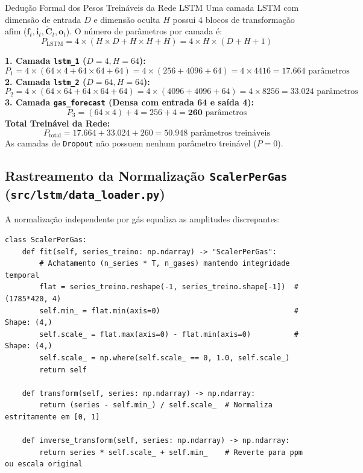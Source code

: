 \documentclass[11pt,a4paper]{article}
\begin{document}
\begin{mathBox}{Dedução Formal dos Pesos Treináveis da Rede LSTM}
Uma camada LSTM com dimensão de entrada $D$ e dimensão oculta $H$ possui 4 blocos de transformação afim ($\mathbf{f}_t, \mathbf{i}_t, \tilde{\mathbf{C}}_t, \mathbf{o}_t$). O número de parâmetros por camada é:
\begin{equation}
  P_{\text{LSTM}} = 4 \times \left( H \times D + H \times H + H \right) = 4 \times H \times (D + H + 1)
\end{equation}

\textbf{1. Camada \texttt{lstm\_1} ($D=4, H=64$):}
\begin{equation}
  P_1 = 4 \times \left( 64 \times 4 + 64 \times 64 + 64 \right) = 4 \times (256 + 4096 + 64) = 4 \times 4416 = \mathbf{17.664} \text{ parâmetros}
\end{equation}
\textbf{2. Camada \texttt{lstm\_2} ($D=64, H=64$):}
\begin{equation}
  P_2 = 4 \times \left( 64 \times 64 + 64 \times 64 + 64 \right) = 4 \times (4096 + 4096 + 64) = 4 \times 8256 = \mathbf{33.024} \text{ parâmetros}
\end{equation}
\textbf{3. Camada \texttt{gas\_forecast} (Densa com entrada 64 e saída 4):}
\begin{equation}
  P_3 = (64 \times 4) + 4 = 256 + 4 = \mathbf{260} \text{ parâmetros}
\end{equation}
\textbf{Total Treinável da Rede:}
\begin{equation}
  P_{\text{total}} = 17.664 + 33.024 + 260 = \mathbf{50.948} \text{ parâmetros treináveis}
\end{equation}
As camadas de \texttt{Dropout} não possuem nenhum parâmetro treinável ($P=0$).
\end{mathBox}

\subsection{Rastreamento da Normalização \texttt{ScalerPerGas} (\texttt{src/lstm/data\_loader.py})}
A normalização independente por gás equaliza as amplitudes discrepantes:

\begin{lstlisting}
class ScalerPerGas:
    def fit(self, series_treino: np.ndarray) -> "ScalerPerGas":
        # Achatamento (n_series * T, n_gases) mantendo integridade temporal
        flat = series_treino.reshape(-1, series_treino.shape[-1])  # (1785*420, 4)
        self.min_ = flat.min(axis=0)                               # Shape: (4,)
        self.scale_ = flat.max(axis=0) - flat.min(axis=0)          # Shape: (4,)
        self.scale_ = np.where(self.scale_ == 0, 1.0, self.scale_)
        return self

    def transform(self, series: np.ndarray) -> np.ndarray:
        return (series - self.min_) / self.scale_  # Normaliza estritamente em [0, 1]

    def inverse_transform(self, series: np.ndarray) -> np.ndarray:
        return series * self.scale_ + self.min_    # Reverte para ppm ou escala original
\end{lstlisting}
\end{document}
